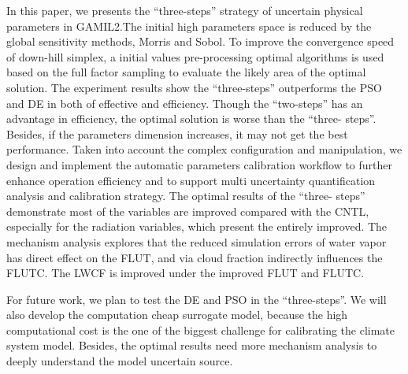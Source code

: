 \documentclass[gmd, manuscript]{copernicus}
\begin{document}
In this paper, we presents the ``three-steps'' strategy of uncertain physical parameters in
GAMIL2.The initial high parameters space is reduced by the global sensitivity methods, Morris and
Sobol. To improve the convergence speed of down-hill simplex, a initial values pre-processing
optimal algorithms is used based on the full factor sampling to evaluate the likely area of the
optimal solution. The experiment results show the ``three-steps'' outperforms the PSO and DE in
both of effective and efficiency. Though the ``two-steps'' has an advantage in efficiency, the
optimal solution is worse than the ``three- steps''. Besides, if the parameters dimension
increases, it may not get the best performance. Taken into account the complex configuration and
manipulation, we design and implement the automatic parameters calibration workflow to further
enhance operation efficiency and to support multi uncertainty quantification analysis and
calibration strategy. The optimal results of the ``three- steps'' demonstrate most of the variables
are improved compared with the CNTL, especially for the radiation variables, which present the
entirely improved. The mechanism analysis explores that the reduced simulation errors of water 
vapor has direct effect on the FLUT, and via cloud fraction indirectly influences the FLUTC. The 
LWCF is improved under the improved FLUT and FLUTC.

For future work, we plan to test the DE and PSO in the ``three-steps''. We will also develop the computation cheap surrogate model, because the high computational cost is the one of the biggest challenge for calibrating the climate system model. Besides, the optimal results need more mechanism analysis to deeply understand the model uncertain source.  








\end{document}
